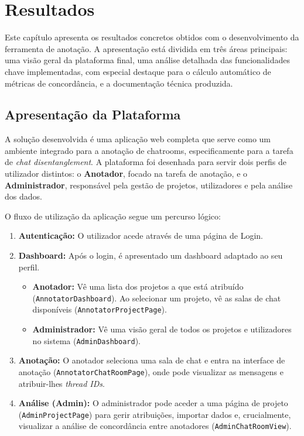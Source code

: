 \chapter{Resultados}
\label{cha:resultados}

Este capítulo apresenta os resultados concretos obtidos com o desenvolvimento da ferramenta de anotação. A apresentação está dividida em três áreas principais: uma visão geral da plataforma final, uma análise detalhada das funcionalidades chave implementadas, com especial destaque para o cálculo automático de métricas de concordância, e a documentação técnica produzida.

\section{Apresentação da Plataforma}

A solução desenvolvida é uma aplicação web completa que serve como um ambiente integrado para a anotação de chatrooms, especificamente para a tarefa de \textit{chat disentanglement}. A plataforma foi desenhada para servir dois perfis de utilizador distintos: o \textbf{Anotador}, focado na tarefa de anotação, e o \textbf{Administrador}, responsável pela gestão de projetos, utilizadores e pela análise dos dados.

O fluxo de utilização da aplicação segue um percurso lógico:
\begin{enumerate}
    \item \textbf{Autenticação:} O utilizador acede através de uma página de Login.
    \item \textbf{Dashboard:} Após o login, é apresentado um dashboard adaptado ao seu perfil.
    \begin{itemize}
        \item \textbf{Anotador:} Vê uma lista dos projetos a que está atribuído (\texttt{AnnotatorDashboard}). Ao selecionar um projeto, vê as salas de chat disponíveis (\texttt{AnnotatorProjectPage}).
        \item \textbf{Administrador:} Vê uma visão geral de todos os projetos e utilizadores no sistema (\texttt{AdminDashboard}).
    \end{itemize}
    \item \textbf{Anotação:} O anotador seleciona uma sala de chat e entra na interface de anotação (\texttt{AnnotatorChatRoomPage}), onde pode visualizar as mensagens e atribuir-lhes \textit{thread IDs}.
    \item \textbf{Análise (Admin):} O administrador pode aceder a uma página de projeto (\texttt{AdminProjectPage}) para gerir atribuições, importar dados e, crucialmente, visualizar a análise de concordância entre anotadores (\texttt{AdminChatRoomView}).
\end{enumerate}

